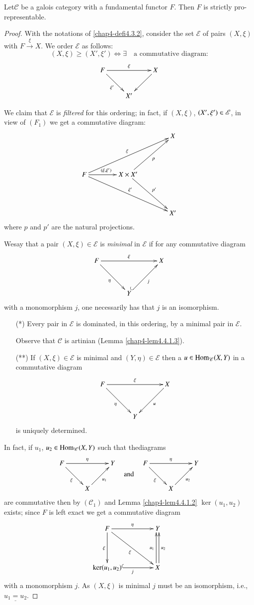 \begin{sublemma}\label{chap4-lem4.4.1.4}
Let\pageoriginale $\mathscr{C}$ be a galois category with a
fundamental functor $F$. Then $F$ is strictly pro-representable.
\end{sublemma}

\begin{proof}
With the notations of \ref{chap4-defi4.3.2}, consider the set
$\mathscr{E}$ of pairs $(X,\xi)$ with $F\xrightarrow{\xi}X$. We order
$\mathscr{E}$ as follows: 
$$
(X,\xi)\geq (X',\xi')\Leftrightarrow \exists\quad\text{a commutative diagram:}
$$
\[
\xymatrix{
F\ar[rr]^{\xi}\ar[dr]_{\xi'} & & X\ar[dl]\\
 & X' &
}
\]

We claim that $\mathscr{E}$ is {\em filtered} for this ordering; in
fact, if $(X,\xi)$, $(X',\xi')\break \in\mathscr{E}$, in view of $(F_{1})$ we
get a commutative diagram:
\[
\xymatrix@C=1.4cm@R=1.5cm{
 & & X\\
F\ar[urr]^{\xi}\ar[r]^{(\xi,\xi')}\ar[drr]^{\xi'} & X\times
X'\ar[dr]^{p'}\ar[ur]_{p} & \\ 
 & & X'
}
\]
where $p$ and $p'$ are the natural projections.

We\pageoriginale say that a pair $(X,\xi)\in\mathscr{E}$ is {\em
  minimal} in $\mathscr{E}$ if for any commutative diagram
\[
\xymatrix@=1.2cm{
F\ar[rr]^{\xi}\ar[dr]_{\eta} & & X\\
 & Y\ar@{^{(}->}[ur]_{j} & 
}
\]
with a monomorphism $j$, one necessarily has that $j$ is an
isomorphism.
\begin{itemize}
\item[(*)] Every pair in $\mathscr{E}$ is dominated, in this ordering,
  by a minimal pair in $\mathscr{E}$.

Observe that $\mathscr{C}$ is artinian (Lemma \ref{chap4-lem4.4.1.3}).

\item[(**)] If $(X,\xi)\in\mathscr{E}$ is minimal and
  $(Y,\eta)\in\mathscr{E}$ then a $u\in \operatorname{Hom}_{\mathscr{C}}(X,Y)$ in a
  commutative diagram
\[
\xymatrix@=1.2cm{
F\ar[rr]^{\xi}\ar[dr]_{\eta} & & X\ar[dl]^{u}\\
 & Y & 
}
\]
is uniquely determined.
\end{itemize}

In fact, if $u_{1}$, $u_{2}\in \operatorname{Hom}_{\mathscr{C}}(X,Y)$ such that
the\pageoriginale diagrams
\[
\vcenter{\xymatrix{
F\ar[rr]^{\eta}\ar[dr]_{\xi} & & Y\\
 & X\ar[ur]_{u_{1}}
}}
\quad\text{and}\quad 
\vcenter{\xymatrix{
F\ar[rr]^{\eta}\ar[dr]_{\xi} & & Y\\
 & X\ar[ur]_{u_{2}}
}}
\]
are commutative then by $(\mathscr{C}_{1})$ and Lemma \ref{chap4-lem4.4.1.2}
$\ker (u_{1},u_{2})$ exists; since $F$ is left exact we get a
commutative diagram
\[
\xymatrix@=1.5cm{
F \ar[r]^{\eta}\ar[d]_{\xi}\ar[dr]_{\xi} & Y\\
\ker(u_{1},u_{2})\ar@{^{(}->}[r]_{j} & X\ar@<.2em>[u]^{u_{1}}\ar@<-.2em>[u]_{u_{2}}
}
\]
with a monomorphism $j$. As $(X,\xi)$ is minimal $j$ must be an
isomorphism, i.e., $\underline{u_{1}=u_{2}}$.


\end{proof}

